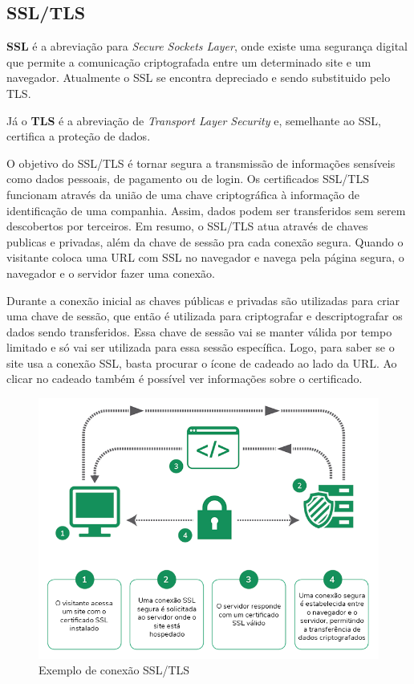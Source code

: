 \documentclass[
    openany,
    12pt,               %
    twoside,            %
    a4paper,            %
    english,            %
    brazil,             %
    ]{abntex2}
\begin{document}
\subsection{SSL/TLS}
\label{cap:ssl-tls}

\textbf{SSL} é a abreviação para \textit{Secure Sockets Layer}, onde existe uma segurança digital que permite a comunicação criptografada entre um determinado site e um navegador. Atualmente o SSL se encontra depreciado e sendo substituido pelo TLS.

Já o \textbf{TLS} é a abreviação de \textit{Transport Layer Security} e, semelhante ao SSL, certifica a proteção de dados.

O objetivo do SSL/TLS é tornar segura a transmissão de informações sensíveis como dados pessoais, de pagamento ou de login. Os certificados SSL/TLS funcionam através da união de uma chave criptográfica à informação de identificação de uma companhia. Assim, dados podem ser transferidos sem serem descobertos por terceiros. Em resumo, o SSL/TLS atua através de chaves publicas e privadas, além da chave de sessão pra cada conexão segura. Quando o visitante coloca uma URL com SSL no navegador e navega pela página segura, o navegador e o servidor fazer uma conexão.

Durante a conexão inicial as chaves públicas e privadas são utilizadas para criar uma chave de sessão, que então é utilizada para criptografar e descriptografar os dados sendo transferidos. Essa chave de sessão vai se manter válida por tempo limitado e só vai ser utilizada para essa sessão específica. Logo, para saber se o site usa a conexão SSL, basta procurar o ícone de cadeado ao lado da URL. Ao clicar no cadeado também é possível ver informações sobre o certificado.

\begin{figure}[htpb]
\centering
\includegraphics[width=13.5cm]{ssl-funcionamento.png}
\caption{Exemplo de conexão SSL/TLS}
\end{figure}
\end{document}
